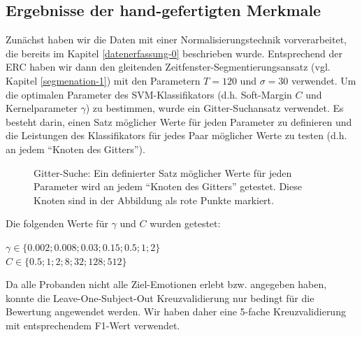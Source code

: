 \subsection{Ergebnisse der hand-gefertigten Merkmale} \label{ergebnisse-hc-features-subsec}

Zunächst haben wir die Daten mit einer Normalisierungstechnik vorverarbeitet, die bereits im Kapitel \ref{datenerfassung-0} beschrieben wurde.
Entsprechend der ERC haben wir dann den gleitenden Zeitfenster-Segmentierungsansatz (vgl. Kapitel \ref{segmenation-1}) mit den Parametern $T=120$ und $\sigma=30$ verwendet.
Um die optimalen Parameter des SVM-Klassifikators (d.h. Soft-Margin $C$ und Kernelparameter $\gamma$) zu bestimmen, wurde ein Gitter-Suchansatz verwendet.
Es besteht darin, einen Satz möglicher Werte für jeden Parameter zu definieren und die Leistungen des Klassifikators für jedes Paar möglicher Werte zu testen (d.h. an jedem ``Knoten des Gitters''). \\

\begin{figure}[h]
\vspace{0.2cm} \caption[Gitter-Suche]{ Gitter-Suche: Ein definierter Satz möglicher Werte für jeden Parameter wird an jedem ``Knoten des Gitters'' getestet. Diese Knoten sind in der Abbildung als rote Punkte markiert. }
\end{figure} 
\vspace{0.5cm}

Die folgenden Werte für $\gamma$ und $C$ wurden getestet:
\begin{center}
${\displaystyle \gamma \in \{0.002; 0.008; 0.03; 0.15; 0.5; 1; 2\}}$ \\
${\displaystyle C \in \{ 0.5; 1; 2; 8; 32; 128; 512 \}}$ \\
\end{center}
\vspace{0.5cm}

Da alle Probanden nicht alle Ziel-Emotionen erlebt bzw. angegeben haben, konnte die Leave-One-Subject-Out Kreuzvalidierung nur bedingt für die Bewertung angewendet werden.
Wir haben daher eine 5-fache Kreuzvalidierung mit entsprechendem F1-Wert verwendet. 

